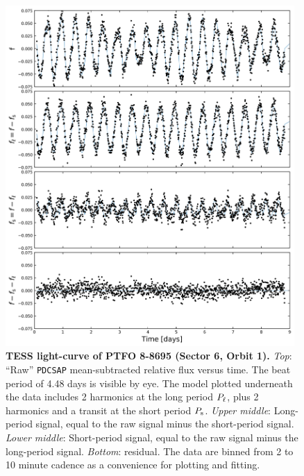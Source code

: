 \documentclass[12pt,twocolumn,tighten]{aastex62}
\begin{document}
\begin{figure}[t]
	\begin{center}
		\leavevmode
		\includegraphics[width=0.98\textwidth]{f1.png}
	\end{center}
	\vspace{-0.7cm}
	\caption{ {\bf TESS light-curve of PTFO 8-8695 (Sector 6, Orbit 1).}
	{\it Top}: ``Raw'' \texttt{PDCSAP} mean-subtracted relative flux versus time. The beat period of 4.48 days is visible by eye.
	The model plotted underneath the data includes 2 harmonics at the long
	period $P_{\rm \ell}$, plus 2 harmonics and a transit at the short period $P_{\rm s}$.
	{\it Upper middle}: Long-period signal, equal to the raw signal minus the short-period signal.
	{\it Lower middle}: Short-period signal, equal to the raw signal minus the long-period signal.
	{\it Bottom}: residual.
	The data are binned from 2 to 10 minute cadence as a convenience for plotting and fitting.
		\label{fig:splitsignal}
	}
\end{figure}
\end{document}

